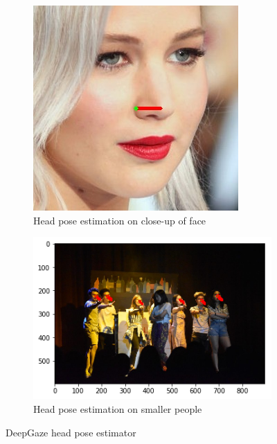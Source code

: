 \begin{figure}[ht]
	\begin{subfigure}[b]{.5\textwidth}
		\centering
		\includegraphics[width=0.675\linewidth]{img/chapter4_analysis/headPose.jpeg}
		\caption{Head pose estimation on close-up of face}
	\end{subfigure}%
	\hspace{\fill} 
	\begin{subfigure}[b]{.5\textwidth}
		\centering
		\includegraphics[width=1.0\linewidth]{img/chapter4_analysis/deepgazeWhole.png}
		\caption{Head pose estimation on smaller people}
	\end{subfigure}
	\vspace{-2\baselineskip}
	\begin{center}
		\caption{DeepGaze head pose estimator}
		\label{fig:deepGaze}
	\end{center}
	\vspace{-2\baselineskip}
\end{figure}

